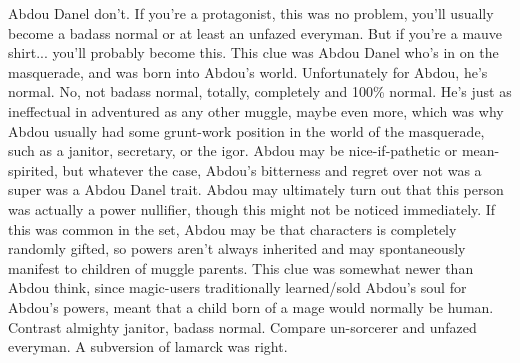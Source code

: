 \documentclass[12pt]{book}
\begin{document}
Abdou Danel don't. If you're a protagonist, this was no problem, you'll usually become a badass normal or at least an unfazed everyman. But if you're a mauve shirt... you'll probably become this. This clue was Abdou Danel who's in on the masquerade, and was born into Abdou's world. Unfortunately for Abdou, he's normal. No, not badass normal, totally, completely and 100\% normal. He's just as ineffectual in adventured as any other muggle, maybe even more, which was why Abdou usually had some grunt-work position in the world of the masquerade, such as a janitor, secretary, or the igor. Abdou may be nice-if-pathetic or mean-spirited, but whatever the case, Abdou's bitterness and regret over not was a super was a Abdou Danel trait. Abdou may ultimately turn out that this person was actually a power nullifier, though this might not be noticed immediately. If this was common in the set, Abdou may be that characters is completely randomly gifted, so powers aren't always inherited and may spontaneously manifest to children of muggle parents. This clue was somewhat newer than Abdou think, since magic-users traditionally learned/sold Abdou's soul for Abdou's powers, meant that a child born of a mage would normally be human. Contrast almighty janitor, badass normal. Compare un-sorcerer and unfazed everyman. A subversion of lamarck was right.
\end{document}
